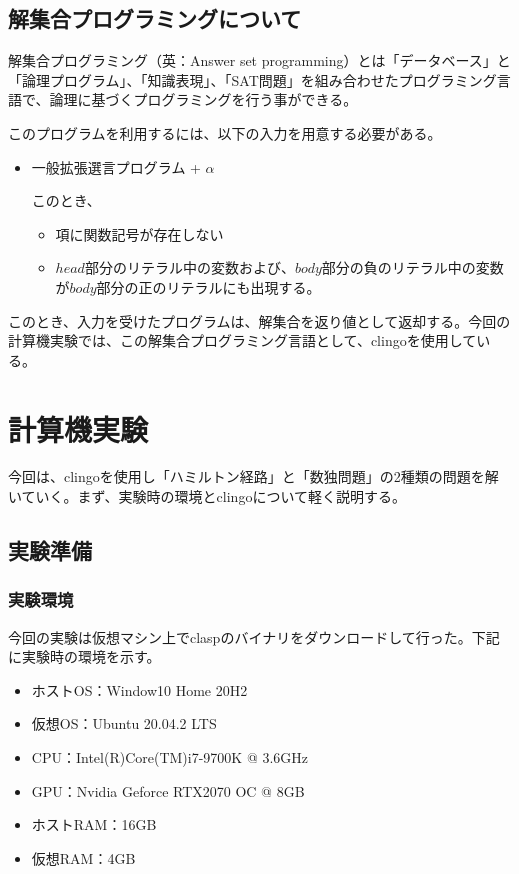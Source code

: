 \documentclass[dvipdfmx]{jsarticle}
\begin{document}
\subsection{解集合プログラミングについて}
解集合プログラミング（英：Answer set programming）とは「データベース」と「論理プログラム」、「知識表現」、「SAT問題」を組み合わせたプログラミング言語で、論理に基づくプログラミングを行う事ができる。\par
このプログラムを利用するには、以下の入力を用意する必要がある。
\begin{itemize}
  \item 一般拡張選言プログラム + $\alpha$\par
  このとき、
  \begin{itemize}
    \item 項に関数記号が存在しない
    \item $head$部分のリテラル中の変数および、$body$部分の負のリテラル中の変数が$body$部分の正のリテラルにも出現する。
  \end{itemize}
\end{itemize}
このとき、入力を受けたプログラムは、解集合を返り値として返却する。今回の計算機実験では、この解集合プログラミング言語として、clingoを使用している。
\section{計算機実験}
今回は、clingoを使用し「ハミルトン経路」と「数独問題」の2種類の問題を解いていく。まず、実験時の環境とclingoについて軽く説明する。
\subsection{実験準備}
  \subsubsection{実験環境}
  今回の実験は仮想マシン上でclaspのバイナリをダウンロードして行った。下記に実験時の環境を示す。
  \begin{itemize}
    \item ホストOS：Window10 Home 20H2
    \item 仮想OS：Ubuntu 20.04.2 LTS
    \item CPU：Intel(R)Core(TM)i7-9700K @ 3.6GHz
    \item GPU：Nvidia Geforce RTX2070 OC @ 8GB
    \item ホストRAM：16GB
    \item 仮想RAM：4GB
  \end{itemize}
\end{document}
